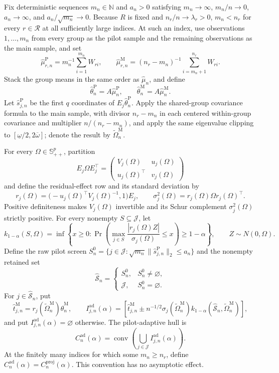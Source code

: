 Fix deterministic sequences \(m_n\in\mathbb N\) and \(a_n>0\) satisfying \(m_n\to\infty\), \(m_n/n\to0\), \(a_n\to\infty\), and \(a_n/\sqrt{m_n}\to0\).  Because \(R\) is fixed and \(n_r/n\to\lambda_r>0\), \(m_n<n_r\) for every \(r\in\mathcal R\) at all sufficiently large indices.  At such an index, use observations \(1,\ldots,m_n\) from every group as the pilot sample and the remaining observations as the main sample, and set
\[
 \widehat\mu_{r,n}^{\mathrm P}
 =m_n^{-1}\sum_{i=1}^{m_n}W_{ri},
 \qquad
 \widehat\mu_{r,n}^{\mathrm M}
 =(n_r-m_n)^{-1}\sum_{i=m_n+1}^{n_r}W_{ri}.
\]
Stack the group means in the same order as \(\widehat\mu_n\), and define
\[
 \widehat\theta_n^{\mathrm P}=A\widehat\mu_n^{\mathrm P},
 \qquad
 \widehat\theta_n^{\mathrm M}=A\widehat\mu_n^{\mathrm M}.
\]
Let \(\widehat s_{j,n}^{\mathrm P}\) be the first \(q\) coordinates of \(E_j\widehat\theta_n^{\mathrm P}\).  Apply the shared-group covariance formula to the main sample, with divisor \(n_r-m_n\) in each centered within-group covariance and multiplier \(n/(n_r-m_n)\), and apply the same eigenvalue clipping to \([\underline\omega/2,2\overline\omega]\); denote the result by \(\widetilde\Omega_n^{\mathrm M}\).

For every \(\Omega\in\mathbb S_{++}^p\), partition
\[
 E_j\Omega E_j^{\top}
 =\begin{pmatrix}V_j(\Omega)&u_j(\Omega)\\
 u_j(\Omega)^{\top}&v_j(\Omega)\end{pmatrix}
\]
and define the residual-effect row and its standard deviation by
\[
 r_j(\Omega)=\bigl(-u_j(\Omega)^{\top}V_j(\Omega)^{-1},1\bigr)E_j,
 \qquad
 \sigma_j^2(\Omega)=r_j(\Omega)\Omega r_j(\Omega)^{\top}.
\]
Positive definiteness makes \(V_j(\Omega)\) invertible and its Schur complement \(\sigma_j^2(\Omega)\) strictly positive.  For every nonempty \(S\subseteq\mathcal J\), let
\[
 k_{1-\alpha}(S,\Omega)
 =\inf\left\{x\ge0:
 \Pr\left(
   \max_{j\in S}\frac{|r_j(\Omega)Z|}{\sigma_j(\Omega)}\le x
 \right)\ge1-\alpha\right\},
 \qquad Z\sim N(0,\Omega).
\]
Define the raw pilot screen \(S_n^0=\{j\in\mathcal J:\sqrt{m_n}\|\widehat s_{j,n}^{\mathrm P}\|_2\le a_n\}\) and the nonempty retained set
\[
 \widehat{\mathcal S}_n=
 \begin{cases}
 S_n^0,&S_n^0\ne\varnothing,\\
 \mathcal J,&S_n^0=\varnothing.
 \end{cases}
\]
For \(j\in\widehat{\mathcal S}_n\), put
\[
 \widehat t_{j,n}^{\mathrm M}
 =r_j(\widetilde\Omega_n^{\mathrm M})\widehat\theta_n^{\mathrm M},
 \qquad
 I_{j,n}^{\mathrm{ad}}(\alpha)
 =\left[
 \widehat t_{j,n}^{\mathrm M}
 \mathbin{\pm}n^{-1/2}\sigma_j(\widetilde\Omega_n^{\mathrm M})
 k_{1-\alpha}(\widehat{\mathcal S}_n,\widetilde\Omega_n^{\mathrm M})
 \right],
\]
and put \(I_{j,n}^{\mathrm{ad}}(\alpha)=\varnothing\) otherwise.  The pilot-adaptive hull is
\[
 C_n^{\mathrm{ad}}(\alpha)
 =\operatorname{conv}\left(\bigcup_{j\in\mathcal J}
 I_{j,n}^{\mathrm{ad}}(\alpha)\right).
\]
At the finitely many indices for which some \(m_n\ge n_r\), define \(C_n^{\mathrm{ad}}(\alpha)=C_n^{\mathrm{proj}}(\alpha)\).  This convention has no asymptotic effect.

